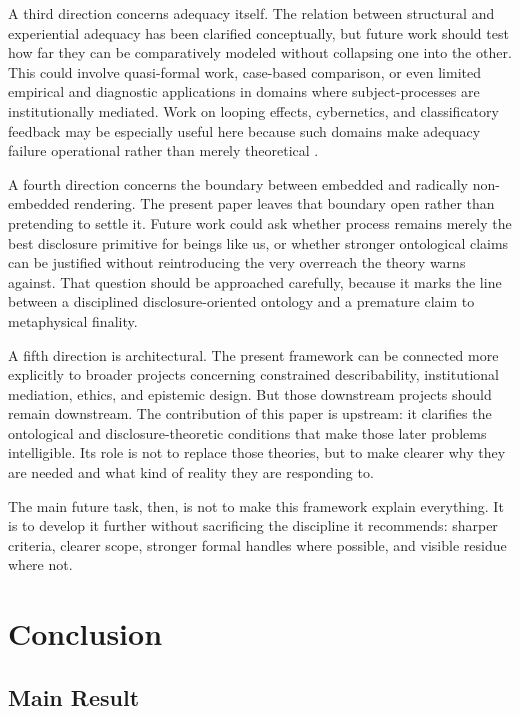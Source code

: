 \documentclass[11pt]{article}
\begin{document}
A third direction concerns adequacy itself. The relation between structural and experiential adequacy has been clarified conceptually, but future work should test how far they can be comparatively modeled without collapsing one into the other. This could involve quasi-formal work, case-based comparison, or even limited empirical and diagnostic applications in domains where subject-processes are institutionally mediated. Work on looping effects, cybernetics, and classificatory feedback may be especially useful here because such domains make adequacy failure operational rather than merely theoretical \cite{Bateson1972,Pask1975,Hacking1995}.

A fourth direction concerns the boundary between embedded and radically non-embedded rendering. The present paper leaves that boundary open rather than pretending to settle it. Future work could ask whether process remains merely the best disclosure primitive for beings like us, or whether stronger ontological claims can be justified without reintroducing the very overreach the theory warns against. That question should be approached carefully, because it marks the line between a disciplined disclosure-oriented ontology and a premature claim to metaphysical finality.

A fifth direction is architectural. The present framework can be connected more explicitly to broader projects concerning constrained describability, institutional mediation, ethics, and epistemic design. But those downstream projects should remain downstream. The contribution of this paper is upstream: it clarifies the ontological and disclosure-theoretic conditions that make those later problems intelligible. Its role is not to replace those theories, but to make clearer why they are needed and what kind of reality they are responding to.

The main future task, then, is not to make this framework explain everything. It is to develop it further without sacrificing the discipline it recommends: sharper criteria, clearer scope, stronger formal handles where possible, and visible residue where not.
\section{Conclusion}

\subsection{Main Result}
\end{document}
